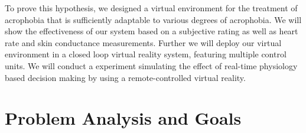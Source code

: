 To prove this hypothesis, we designed a virtual environment for the treatment of acrophobia that is sufficiently adaptable to various degrees of acrophobia. We will show the effectiveness of our system based on a subjective rating as well as heart rate and skin conductance measurements. Further we will deploy our virtual environment in a closed loop virtual reality system, featuring multiple control units. We will conduct a experiment simulating the effect of real-time physiology based decision making by using a remote-controlled virtual reality.\\

\section{Problem Analysis and Goals}
%
%
